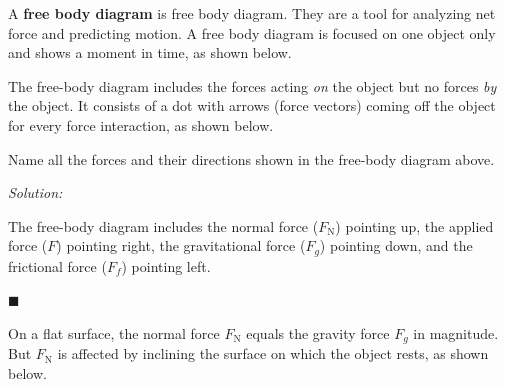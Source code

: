 \documentclass[dvipsnames]{article}
\begin{document}
A \textbf{\gls{free body diagram}} is \glsdesc{free body diagram}. They are a tool for analyzing net force and predicting motion. A free body diagram is focused on one object only and shows a moment in time, as shown below.

\begin{center}
\end{center}

The free-body diagram includes the forces acting \textit{on} the object but no forces \textit{by} the object. It consists of a dot with arrows (force vectors) coming off the object for every force interaction, as shown below.

\begin{example}
    Name all the forces and their directions shown in the free-body diagram above.
\end{example}

\textit{Solution:}

The free-body diagram includes the normal force ($F_\mathrm{N}$) pointing up, the applied force ($F$) pointing right, the gravitational force ($F_g$) pointing down, and the frictional force ($F_f$) pointing left. 

\hfill $\blacksquare$

On a flat surface, the normal force $F_\mathrm{N}$ equals the gravity force $F_g$ in magnitude. But $F_\mathrm{N}$ is affected by inclining the surface on which the object rests, as shown below.
\end{document}
